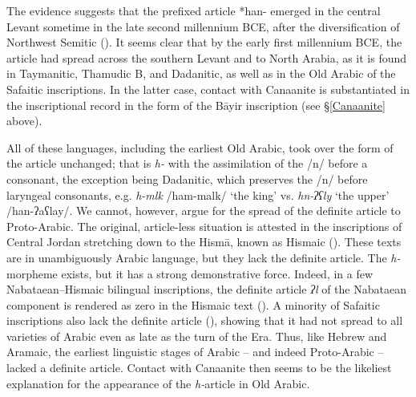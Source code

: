 \documentclass[output=paper]{langsci/langscibook}
\begin{document}
The evidence suggests that the prefixed article *han- emerged in the central Levant sometime in the late second millennium BCE, after the diversification of Northwest Semitic (\citealt{Tropper2001,Gzella2006,Pat-El2006}). It seems clear that by the early first millennium BCE, the article had spread across the southern Levant and to North Arabia, as it is found in Taymanitic, Thamudic B, and Dadanitic, as well as in the Old Arabic of the Safaitic inscriptions. In the latter case, contact with Canaanite is substantiated in the inscriptional record in the form of the Bāyir inscription (see §\ref{Canaanite} above). 

All of these languages, including the earliest Old Arabic, took over the form of the article unchanged; that is \textit{h-} with the assimilation of the /n/ before a consonant, the exception being Dadanitic, which preserves the /n/ before laryngeal consonants, e.g. \textit{h-mlk} /ham-malk/ ‘the king’ vs. \textit{hn-ʔʕly} ‘the upper’ /han-ʔaʕlay/. We cannot, however, argue for the spread of the definite article to Proto-Arabic. The original, article-less situation is attested in the inscriptions of Central Jordan stretching down to the Hismā, known as Hismaic (\citealt{GrafZwettler2004}). These texts are in unambiguously Arabic language, but they lack the definite article. The \textit{h-}morpheme exists, but it has a strong demonstrative force. Indeed, in a few Nabataean--Hismaic bilingual inscriptions, the definite article \textit{ʔl} of the Nabataean component is rendered as zero in the Hismaic text (\citealt{Hayajneh2009}). A minority of Safaitic inscriptions also lack the definite article (\citealt{Al-Jallad2018ANA}), showing that it had not spread to all varieties of Arabic even as late as the turn of the Era. Thus, like Hebrew and Aramaic, the earliest linguistic stages of Arabic – and indeed Proto-Arabic – lacked a definite article. Contact with Canaanite then seems to be the likeliest explanation for the appearance of the \textit{h-}article in Old Arabic.
\end{document}
